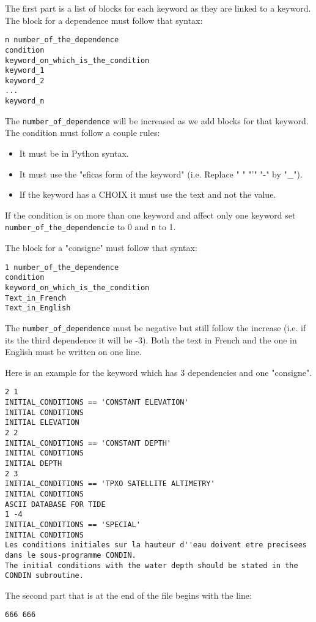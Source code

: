 The first part is a list of blocks for each keyword as they are linked to a keyword.
The block for a dependence must follow that syntax:
\begin{verbatim}
n number_of_the_dependence
condition
keyword_on_which_is_the_condition
keyword_1
keyword_2
...
keyword_n
\end{verbatim}
The \verb!number_of_dependence! will be increased as we add blocks for that
keyword.
The condition must follow a couple rules:
\begin{itemize}
  \item It must be in Python syntax.
  \item It must use the "eficas form of the keyword" (i.e. Replace " " "'" "-"
    by "\_").
  \item If the keyword has a CHOIX it must use the text and not the value.
\end{itemize}

If the condition is on more than one keyword and affect only one keyword set
\verb!number_of_the_dependencie! to 0 and \verb!n! to 1.

The block for a "consigne" must follow that syntax:
\begin{verbatim}
1 number_of_the_dependence
condition
keyword_on_which_is_the_condition
Text_in_French
Text_in_English
\end{verbatim}
The \verb!number_of_dependence! must be negative but still follow the increase
(i.e. if its the third dependence it will be -3). Both the text in French and
the one in English must be written on one line.

Here is an example for the keyword  which has 3
dependencies and one "consigne".
\begin{verbatim}
2 1
INITIAL_CONDITIONS == 'CONSTANT ELEVATION'
INITIAL CONDITIONS
INITIAL ELEVATION
2 2
INITIAL_CONDITIONS == 'CONSTANT DEPTH'
INITIAL CONDITIONS
INITIAL DEPTH
2 3
INITIAL_CONDITIONS == 'TPXO SATELLITE ALTIMETRY'
INITIAL CONDITIONS
ASCII DATABASE FOR TIDE
1 -4
INITIAL_CONDITIONS == 'SPECIAL'
INITIAL CONDITIONS
Les conditions initiales sur la hauteur d''eau doivent etre precisees dans le sous-programme CONDIN.
The initial conditions with the water depth should be stated in the CONDIN subroutine.
\end{verbatim}

The second part that is at the end of the file begins with the line:
\begin{verbatim}
666 666
\end{verbatim}

